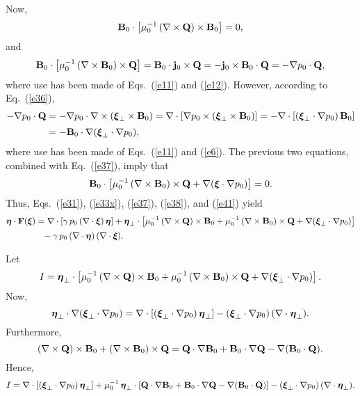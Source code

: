 \documentclass[12pt,prb,aps,notitlepage]{revtex4-1}
\newcommand{\bxi}{\mbox{\boldmath$\xi$}}
\newcommand{\bta}{\mbox{\boldmath$\eta$}}
\begin{document}
Now,
\begin{equation}\label{e38}
{\bf B}_0 \cdot \left[\mu_0^{-1}\,(\nabla\times {\bf Q})\times{\bf B}_0\right] =0,
\end{equation}
and
\begin{align}
{\bf B}_0\cdot\left[\mu_0^{-1}\, (\nabla\times {\bf B}_0)\times {\bf Q}\right]= {\bf B}_0\cdot{\bf j}_0\times {\bf Q} =-{\bf j}_0\times {\bf B}_0\cdot {\bf Q}
=-\nabla p_0\cdot{\bf Q},
\end{align}
where use has been made of Eqs.~(\ref{e11}) and (\ref{e12}). However, according to Eq.~(\ref{e36}), 
\begin{align}
-\nabla p_0\cdot{\bf Q} &= -\nabla p_0\cdot\nabla\times(\bxi_\perp\times {\bf B}_0)=\nabla\cdot\left[\nabla p_0\times(\bxi_\perp\times {\bf B}_0)\right]
=-\nabla\cdot[(\bxi_\perp\cdot\nabla p_0)\, {\bf B}_0]\nonumber\\[0.5ex]
&= - {\bf B}_0\cdot\nabla (\bxi_\perp\cdot\nabla p_0),
\end{align}
where use has been made of Eqs.~(\ref{e11}) and (\ref{e6}). The previous two equations, combined with Eq.~(\ref{e37}), imply that
\begin{equation}\label{e41}
{\bf B}_0\cdot\left[\mu_0^{-1}\, (\nabla\times {\bf B}_0)\times {\bf Q}+\nabla(\bxi\cdot\nabla p_0)\right] =0.
\end{equation}
Thus, Eqs.~(\ref{e31}), (\ref{e33x}), (\ref{e37}), (\ref{e38}), and (\ref{e41}) yield 
\begin{align}\label{e52x}
\bta\cdot {\bf F}(\bxi)&= \nabla\cdot [\gamma\,p_0\,(\nabla\cdot\bxi)\,\bta]+\bta_\perp\cdot\left[ \mu_0^{-1}\,(\nabla\times {\bf Q})\times{\bf B}_0+ \mu_0^{-1}\, (\nabla\times {\bf B}_0)\times {\bf Q}
+\nabla(\bxi_\perp\cdot\nabla p_0)\right] \nonumber\\[0.5ex]
&\phantom{=}-\gamma\,p_0\,(\nabla\cdot\bta)\,(\nabla\cdot\bxi).
\end{align}

Let 
\begin{equation}\label{e43}
I= \bta_\perp\cdot\left[ \mu_0^{-1}\,(\nabla\times {\bf Q})\times{\bf B}_0+ \mu_0^{-1}\, (\nabla\times {\bf B}_0)\times {\bf Q}
+\nabla(\bxi_\perp\cdot\nabla p_0)\right].
\end{equation}
Now,
\begin{equation}
\bta_\perp\cdot\nabla (\bxi_\perp\cdot\nabla p_0)= \nabla\cdot[(\bxi_\perp\cdot \nabla p_0)\,\bta_\perp] - (\bxi_\perp\cdot\nabla p_0)\,(\nabla\cdot
\bta_\perp).
\end{equation}
 Furthermore, 
\begin{equation}
(\nabla\times {\bf Q})\times{\bf B}_0+(\nabla\times {\bf B}_0)\times {\bf Q}= {\bf Q}\cdot\nabla{\bf B}_0
+ {\bf B}_0\cdot\nabla{\bf Q} - \nabla({\bf B}_0\cdot{\bf Q}).
\end{equation}
Hence,
\begin{equation}\label{e46}
I =\nabla\cdot[(\bxi_\perp\cdot \nabla p_0)\,\bta_\perp]+  \mu_0^{-1}\,\bta_\perp\cdot\left[ {\bf Q}\cdot\nabla{\bf B}_0
+ {\bf B}_0\cdot\nabla{\bf Q} - \nabla({\bf B}_0\cdot{\bf Q})\right]  - (\bxi_\perp\cdot\nabla p_0)\,(\nabla\cdot
\bta_\perp).
\end{equation}
\end{document}
